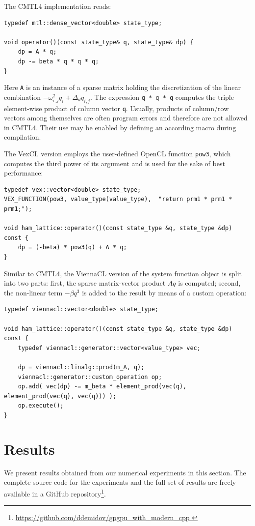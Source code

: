 \documentclass[final]{siamltex}
\newcommand{\code}[1]{\lstinline$#1$}
\begin{document}
The CMTL4 implementation reads:
\begin{lstlisting}
typedef mtl::dense_vector<double> state_type;

void operator()(const state_type& q, state_type& dp) {
    dp = A * q;
    dp -= beta * q * q * q;
}
\end{lstlisting}
Here \code{A} is an instance of a sparse matrix holding the discretization of
the linear combination $- \omega_{i,j}^2 q_i + \Delta_d q_{i,j}$. The
expression \code{q * q * q} computes the triple element-wise product of column
vector \code{q}.  Usually, products of column/row vectors among themselves are
often program errors and therefore are not allowed in CMTL4.  Their use may be
enabled by defining an according macro during compilation.

The VexCL version employs the user-defined OpenCL function \code{pow3}, which
computes the third power of its argument and is used for the sake of best
performance:
\begin{lstlisting}
typedef vex::vector<double> state_type;
VEX_FUNCTION(pow3, value_type(value_type),  "return prm1 * prm1 * prm1;");

void ham_lattice::operator()(const state_type &q, state_type &dp) const {
    dp = (-beta) * pow3(q) + A * q;
}
\end{lstlisting}

Similar to CMTL4, the ViennaCL version of the system function object is split into two parts:
first, the sparse matrix-vector product $Aq$ is computed; second, the
non-linear term $-\beta q^3$ is added to the result by means of a custom
operation:
\begin{lstlisting}
typedef viennacl::vector<double> state_type;

void ham_lattice::operator()(const state_type &q, state_type &dp) const {
    typedef viennacl::generator::vector<value_type> vec;

    dp = viennacl::linalg::prod(m_A, q);
    viennacl::generator::custom_operation op;
    op.add( vec(dp) -= m_beta * element_prod(vec(q), element_prod(vec(q), vec(q))) );
    op.execute();
}
\end{lstlisting}

\section{Results} \label{sec:results}

We present results obtained from our numerical experiments in this section. The
complete source code for the experiments and the full set of results are freely
available in a GitHub repository\footnote{ \href{
https://github.com/ddemidov/gpgpu_with_modern_cpp } {
https://github.com/ddemidov/gpgpu\_with\_modern\_cpp } }.
\end{document}
